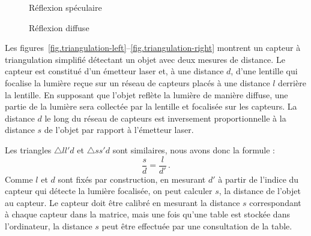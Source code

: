 \begin{figure}
\begin{minipage}{.45\textwidth}
\caption{Réflexion spéculaire}\label{fig.reflect-left}
\end{minipage}
\hspace{\fill}
\begin{minipage}{.45\textwidth}
\caption{Réflexion diffuse}\label{fig.reflect-right}
\end{minipage}
\end{figure}

Les figures~\ref{fig.triangulation-left}--\ref{fig.triangulation-right} montrent un capteur à triangulation simplifié détectant un objet avec deux mesures de distance. Le capteur est constitué d'un émetteur laser et, à une distance $d$, d'une lentille qui focalise la lumière reçue sur un réseau de capteurs placés à une distance $l$ derrière la lentille. En supposant que l'objet reflète la lumière de manière diffuse, une partie de la lumière sera collectée par la lentille et focalisée sur les capteurs. La distance $d$ le long du réseau de capteurs est inversement proportionnelle à la distance $s$ de l'objet par rapport à l'émetteur laser.

Les triangles $\triangle ll'd$ et $\triangle ss'd$ sont similaires, nous avons donc la formule :
\[
\frac{s}{d} = \frac{l}{d'}\,.
\]
Comme $l$ et $d$ sont fixés par construction, en mesurant $d'$ à partir de l'indice du capteur qui détecte la lumière focalisée, on peut calculer $s$, la distance de l'objet au capteur. Le capteur doit être calibré en mesurant la distance $s$ correspondant à chaque capteur dans la matrice, mais une fois qu'une table est stockée dans l'ordinateur, la distance $s$ peut être effectuée par une consultation de la table.

